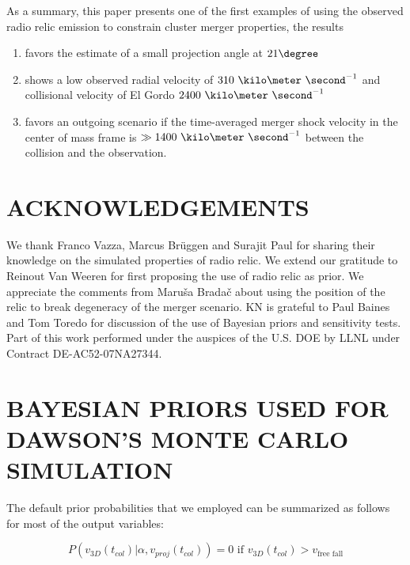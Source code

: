 As a summary, this paper presents one of the first examples of using the
observed radio relic emission to constrain cluster merger properties, the
results
\begin{enumerate}
\item favors the estimate of a small projection angle at $21 \degree$ \\ 
\item shows a low observed radial velocity of
	$310~\kilo\meter~\second^{-1}$ and collisional velocity of El
	Gordo $2400~\kilo\meter~\second^{-1}$ \\ 
\item favors an outgoing scenario if the time-averaged merger shock
	velocity in the center of mass frame is $\gg 1400~\kilo
	\meter~\second^{-1}$ between the collision and the observation. 
\end{enumerate}

\section{ACKNOWLEDGEMENTS}
We thank Franco Vazza, Marcus Br\"{u}ggen and Surajit Paul for sharing
their knowledge on the simulated properties of radio relic. We
extend our gratitude to Reinout Van Weeren for first proposing the use of
radio relic as prior. We appreciate the comments from Maru\v{s}a
Brada\v{c} about using the position of the relic to break degeneracy
of the merger scenario. KN is grateful to Paul Baines and Tom Toredo for
discussion of the use of Bayesian priors and sensitivity tests. 
Part of this work performed under the auspices of the U.S. DOE by LLNL under Contract DE-AC52-07NA27344.





\appendix

\section{BAYESIAN PRIORS USED FOR DAWSON'S MONTE CARLO SIMULATION}
\label{app:priors}
%
The default prior probabilities that we employed can be summarized as
follows for most of the output variables: 

\begin{equation}
	P(v_{3D}(t_{col}) | \alpha, v_{proj}(t_{col})) = 0\text{ if }v_{3D}(t_{col}) >
	v_{\text{free fall}} 
\end{equation}


